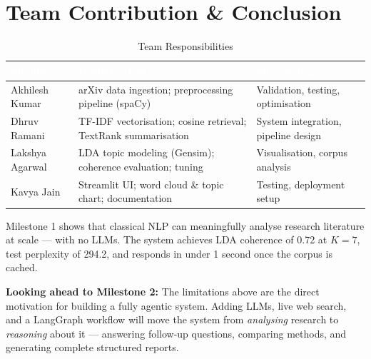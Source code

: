 \documentclass[11pt,a4paper]{article}
\newcommand{\thead}[1]{\cellcolor{tabhead}\textcolor{white}{\textbf{#1}}}
\begin{document}
\section{Team Contribution \& Conclusion}

\begin{table}[h!]
\centering\caption{Team Responsibilities}
\begin{tabular}{L{2.6cm}L{5.0cm}L{3.6cm}}
\toprule
\thead{Member}&\thead{Primary Role}&\thead{Supporting}\\
\midrule
Akhilesh Kumar  & arXiv data ingestion; preprocessing pipeline (spaCy)           & Validation, testing, optimisation \\
Dhruv Ramani    & TF-IDF vectorisation; cosine retrieval; TextRank summarisation & System integration, pipeline design \\
Lakshya Agarwal & LDA topic modeling (Gensim); coherence evaluation; tuning      & Visualisation, corpus analysis \\
Kavya Jain      & Streamlit UI; word cloud \& topic chart; documentation         & Testing, deployment setup \\
\bottomrule
\end{tabular}
\end{table}

\vspace{4pt}
Milestone 1 shows that classical NLP can meaningfully analyse research literature at scale --- with no LLMs. The system achieves LDA coherence of 0.72 at $K=7$, test perplexity of 294.2, and responds in under 1 second once the corpus is cached.

\begin{greenbox}
\textbf{Looking ahead to Milestone 2:} The limitations above are the direct motivation for building a fully agentic system. Adding LLMs, live web search, and a LangGraph workflow will move the system from \emph{analysing} research to \emph{reasoning} about it --- answering follow-up questions, comparing methods, and generating complete structured reports.
\end{greenbox}
\end{document}
